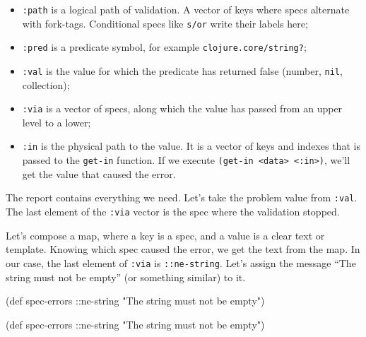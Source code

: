 \begin{itemize}

\item
  \verb|:path| is a logical path of validation. A vector of keys where specs alternate with fork-tags. Conditional specs like \verb|s/or| write their labels here;

\item
  \verb|:pred| is a predicate symbol, for example \texttt{clo\-ju\-re.\-core/\-string?};

\item
  \verb|:val| is the value for which the predicate has returned false (number,  \verb|nil|, collection);

\item
  \verb|:via| is a vector of specs, along which the value has passed from an upper level to a lower;

\item
  \verb|:in| is the physical path to the value. It is a vector of keys and indexes that is passed to the \verb|get-in| function. If we execute \verb|(get-in <data> <:in>)|, we'll get the value that caused the error.

\end{itemize}

The report contains everything we need. Let's take the problem value from \verb|:val|. The last element of the \verb|:via| vector is the spec where the validation stopped.

Let's compose a map, where a key is a spec, and a value is a clear text or template. Knowing which spec caused the error, we get the text from the map. In our case, the last element of \verb|:via| is \verb|::ne-string|. Let's assign the message ``The string must not be empty'' (or something similar) to it.

\ifx\DEVICETYPE\MOBILE

  \begin{clojure}
(def spec-errors
  {::ne-string
   "The string must not be empty"})
  \end{clojure}

\else

  \begin{clojure}
(def spec-errors
  {::ne-string "The string must not be empty"})
  \end{clojure}

